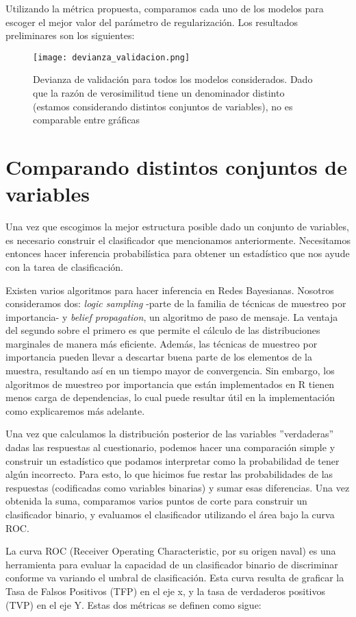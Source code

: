 Utilizando la métrica propuesta, comparamos cada uno de los modelos para escoger el mejor valor del parámetro de regularización. Los resultados preliminares son los siguientes:
\begin{figure}[h]
    \caption{Devianza de validación para todos los modelos considerados. Dado que la razón de verosimilitud tiene un denominador distinto (estamos considerando distintos conjuntos de variables), no es comparable entre gráficas}
    \texttt{[image: devianza\_validacion.png]}
\end{figure}
\section*{Comparando distintos conjuntos de variables}
Una vez que escogimos la mejor estructura posible dado un conjunto de variables, es necesario construir el clasificador que mencionamos anteriormente. Necesitamos entonces hacer inferencia probabilística para obtener un estadístico que nos ayude con la tarea de clasificación.
\par
\noindent
Existen varios algoritmos para hacer inferencia en Redes Bayesianas. Nosotros consideramos dos: \textit{logic sampling} -parte de la familia de técnicas de muestreo por importancia- y \textit{belief propagation}, un algoritmo de paso de mensaje. La ventaja del segundo sobre el primero es que permite el cálculo de las distribuciones marginales de manera más eficiente. Además, las técnicas de muestreo por importancia pueden llevar a descartar buena parte de los elementos de la muestra, resultando así en un tiempo mayor de convergencia. Sin embargo, los algoritmos de muestreo por importancia que están implementados en R tienen menos carga de dependencias, lo cual puede resultar útil en la implementación como explicaremos más adelante.
\par
\noindent
Una vez que calculamos la distribución posterior de las variables ''verdaderas'' dadas las respuestas al cuestionario, podemos hacer una comparación simple y construir un estadístico que podamos interpretar como la probabilidad de tener algún incorrecto. Para esto, lo que hicimos fue restar las probabilidades de las respuestas (codificadas como variables binarias) y sumar esas diferencias. Una vez obtenida la suma, comparamos varios puntos de corte para construir un clasificador binario, y evaluamos el clasificador utilizando el área bajo la curva ROC.
\par
\noindent
La curva ROC (Receiver Operating Characteristic, por su origen naval) es una herramienta para evaluar la capacidad de un clasificador binario de discriminar conforme va variando el umbral de clasificación. Esta curva resulta de graficar la Tasa de Falsos Positivos (TFP) en el eje x, y la tasa de verdaderos positivos (TVP) en el eje Y. Estas dos métricas se definen como sigue:

